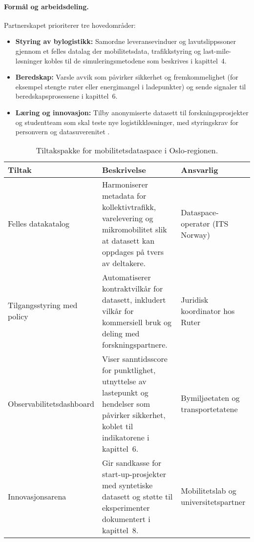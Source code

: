 \paragraph{Formål og arbeidsdeling.} Partnerskapet prioriterer tre hovedområder:
\begin{itemize}
    \item \textbf{Styring av bylogistikk:} Samordne leveransevinduer og lavutslippssoner gjennom et felles datalag der
    mobilitetsdata, trafikkstyring og last-mile-løsninger kobles til de simuleringsmetodene som beskrives i kapittel~4.
    \item \textbf{Beredskap:} Varsle avvik som påvirker sikkerhet og fremkommelighet (for eksempel stengte ruter eller
    energimangel i ladepunkter) og sende signaler til beredskapsprosessene i kapittel~6.
    \item \textbf{Læring og innovasjon:} Tilby anonymiserte datasett til forskningsprosjekter og studentteam som skal teste nye
    logistikkløsninger, med styringskrav for personvern og datasuverenitet \citep{ruter2023dataplattform}.
\end{itemize}

\begin{table}[ht]
    \centering
    \caption{Tiltakspakke for mobilitetsdataspace i Oslo-regionen.}
    \label{tab:kap03-mobilitet-tiltak}
    \begin{tabular}{p{}p{}p{}}
        \toprule
        \textbf{Tiltak} & \textbf{Beskrivelse} & \textbf{Ansvarlig} \\
        \midrule
        Felles datakatalog & Harmoniserer metadata for kollektivtrafikk, varelevering og mikromobilitet slik at datasett kan
        oppdages på tvers av deltakere. & Dataspace-operatør (ITS Norway) \\
        Tilgangsstyring med policy & Automatiserer kontraktvilkår for datasett, inkludert vilkår for kommersiell bruk og deling
        med forskningspartnere. & Juridisk koordinator hos Ruter \\
        Observabilitetsdashboard & Viser sanntidsscore for punktlighet, utnyttelse av lastepunkt og hendelser som påvirker
        sikkerhet, koblet til indikatorene i kapittel~6. & Bymiljøetaten og transportetatene \\
        Innovasjonsarena & Gir sandkasse for start-up-prosjekter med syntetiske datasett og støtte til
        eksperimenter dokumentert i kapittel~8. & Mobilitetslab og universitetspartner \\
        \bottomrule
    \end{tabular}
\end{table}

